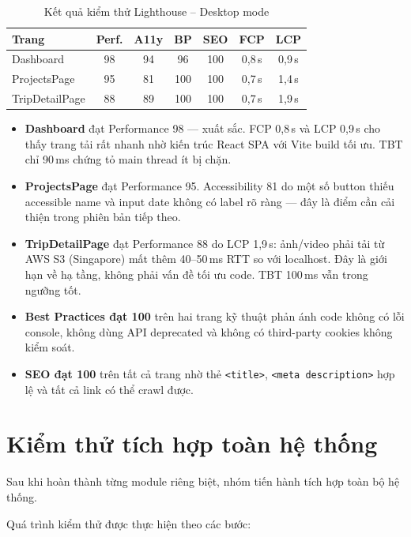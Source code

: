 \documentclass[../DoAn.tex]{subfiles}
\begin{document}
\begin{table}[H]
\centering
\caption{Kết quả kiểm thử Lighthouse -- Desktop mode}
\label{tab:ch8-lighthouse}
\small
\begin{tabular}{|p{3.5cm}|c|c|c|c|c|c|}
\hline
\textbf{Trang} & \textbf{Perf.} & \textbf{A11y} & \textbf{BP} & \textbf{SEO} & \textbf{FCP} & \textbf{LCP} \\
\hline
Dashboard & 98 & 94 & 96 & 100 & 0,8\,s & 0,9\,s \\
\hline
ProjectsPage & 95 & 81 & 100 & 100 & 0,7\,s & 1,4\,s \\
\hline
TripDetailPage & 88 & 89 & 100 & 100 & 0,7\,s & 1,9\,s \\
\hline
\end{tabular}
\end{table}

\begin{itemize}[leftmargin=*, topsep=4pt, itemsep=2pt]
  \item \textbf{Dashboard} đạt Performance 98 --- xuất sắc. FCP 0,8\,s và LCP 0,9\,s cho thấy trang tải rất nhanh nhờ kiến trúc React SPA với Vite build tối ưu. TBT chỉ 90\,ms chứng tỏ main thread ít bị chặn.
  \item \textbf{ProjectsPage} đạt Performance 95. Accessibility 81 do một số button thiếu accessible name và input date không có label rõ ràng --- đây là điểm cần cải thiện trong phiên bản tiếp theo.
  \item \textbf{TripDetailPage} đạt Performance 88 do LCP 1,9\,s: ảnh/video phải tải từ AWS S3 (Singapore) mất thêm 40--50\,ms RTT so với localhost. Đây là giới hạn về hạ tầng, không phải vấn đề tối ưu code. TBT 100\,ms vẫn trong ngưỡng tốt.
  \item \textbf{Best Practices đạt 100} trên hai trang kỹ thuật phản ánh code không có lỗi console, không dùng API deprecated và không có third-party cookies không kiểm soát.
  \item \textbf{SEO đạt 100} trên tất cả trang nhờ thẻ \texttt{<title>}, \texttt{<meta description>} hợp lệ và tất cả link có thể crawl được.
\end{itemize}

\section{Kiểm thử tích hợp toàn hệ thống}

Sau khi hoàn thành từng module riêng biệt, nhóm tiến hành tích hợp toàn bộ hệ thống.

Quá trình kiểm thử được thực hiện theo các bước:
\end{document}
